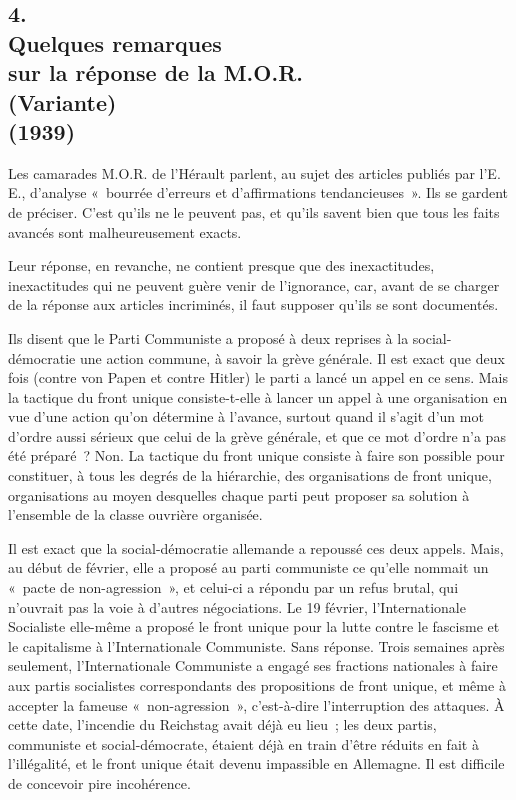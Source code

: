\documentclass[french,twoside]{book} %
\begin{document}
\subsection[4. Quelques remarques, sur la réponse de la M.O.R. (Variante) (1939)]{4. \\
Quelques remarques \\
sur la réponse de la M.O.R. \\
(Variante) \\
(1939)}
\noindent \par
Les camarades M.O.R. de l'Hérault parlent, au sujet des articles publiés par l'E. E., d'analyse « bourrée d'erreurs et d'affirmations tendancieuses ». Ils se gardent de préciser. C'est qu'ils ne le peuvent pas, et qu'ils savent bien que tous les faits avancés sont malheureusement exacts.\par
Leur réponse, en revanche, ne contient presque que des inexactitudes, inexactitudes qui ne peuvent guère venir de l'ignorance, car, avant de se charger de la réponse aux articles incriminés, il faut supposer qu'ils se sont documentés.\par
Ils disent que le Parti Communiste a proposé à deux reprises à la social-démocratie une action commune, à savoir la grève générale. Il est exact que deux fois (contre von Papen et contre Hitler) le parti a lancé un appel en ce sens. Mais la tactique du front unique consiste-t-elle à lancer un appel à une organisation en vue d'une action qu'on détermine à l'avance, surtout quand il s'agit d'un mot d'ordre aussi sérieux que celui de la grève générale, et que ce mot d'ordre n'a pas été préparé ? Non. La tactique du front unique consiste à faire son possible pour constituer, à tous les degrés de la hiérarchie, des organisations de front unique, organisations au moyen desquelles chaque parti peut proposer sa solution à l'ensemble de la classe ouvrière organisée.\par
Il est exact que la social-démocratie allemande a repoussé ces deux appels. Mais, au début de février, elle a proposé au parti communiste ce qu'elle nommait un « pacte de non-agression », et celui-ci a répondu par un refus brutal, qui n'ouvrait pas la voie à d'autres négociations. Le 19 février, l'Inter­nationale Socialiste elle-même a proposé le front unique pour la lutte contre le fascisme et le capitalisme à l'Internationale Communiste. Sans réponse. Trois semaines après seulement, l'Internationale Communiste a engagé ses fractions nationales à faire aux partis socialistes correspondants des propositions de front unique, et même à accepter la fameuse « non-agression », c'est-à-dire l'interruption des attaques. À cette date, l'incendie du Reichstag avait déjà eu lieu ; les deux partis, communiste et social-démocrate, étaient déjà en train d'être réduits en fait à l'illégalité, et le front unique était devenu impassible en Allemagne. Il est difficile de concevoir pire incohérence.\par
\end{document}

